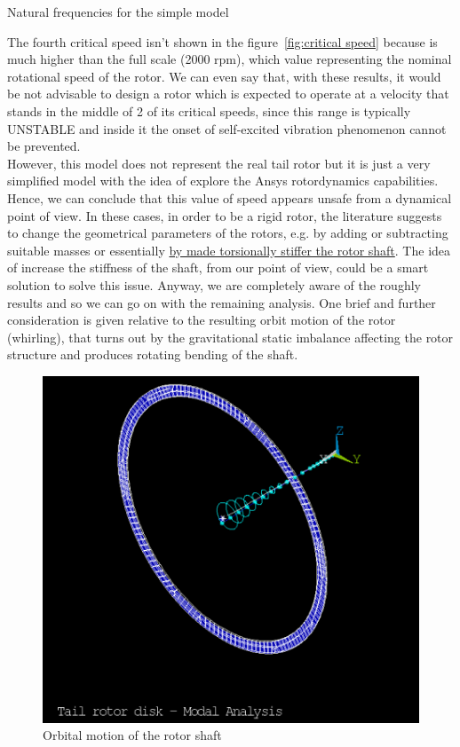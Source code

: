 \begin{table}[h!]
	\centering
	\caption{Natural frequencies for the simple model}
	\label{tab:ModalFreq-Shellmodel}
\end{table}
%
\noindent The fourth critical speed isn't shown in the figure~\ref{fig:critical speed} because is much higher than the full scale (2000 rpm), which value representing the nominal rotational speed of the rotor. We can even say that, with these results, it would be not advisable to design a rotor which is expected to operate at a velocity that stands in the middle of 2 of its critical speeds, since this range is typically UNSTABLE and inside it the onset of self-excited vibration phenomenon cannot be prevented.\\
However, this model does not represent the real tail rotor but it is just a very simplified model with the idea of explore the Ansys rotordynamics capabilities.\\
Hence, we can conclude that this value of speed appears unsafe from a dynamical point of view. In these cases, in order to be a rigid rotor, the literature suggests to change the geometrical parameters of the rotors, e.g. by adding or subtracting suitable masses or essentially \underline{by made torsionally stiffer the rotor shaft}. The idea of increase the stiffness of the shaft, from our point of view, could be a smart solution to solve this issue. Anyway, we are completely aware of the roughly results and so we can go on with the remaining analysis. One brief and further consideration is given relative to the resulting orbit motion of the rotor (whirling), that turns out by the gravitational static imbalance affecting the rotor structure and produces rotating bending of the shaft.

\medskip
\begin{figure}[h]
	\begin{center}
		\centering  		 		
		\includegraphics[width=0.45\linewidth]{PICTURES/5_Rotordynamics/ModalAnalisys004.png} 
	\end{center}
	\caption{Orbital motion of the rotor shaft}
\end{figure}

